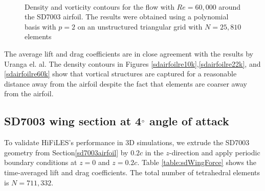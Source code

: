 \begin{figure}[htbp]
\centering
{}
\\

\caption{Density and vorticity contours for the flow with $Re = 60,000$ around the SD7003 airfoil. The results were obtained using a polynomial basis with $p=2$ on an unstructured triangular grid with $N = 25,810$ elements}
\label{sdairfoilre60k}
\end{figure}

The average lift and drag coefficients are in close agreement with the results by Uranga el. al\cite{uranga2011implicit}. The density contours in Figures \eqref{sdairfoilre10k},\eqref{sdairfoilre22k}, and \eqref{sdairfoilre60k} show that vortical structures are captured for a reasonable distance away from the airfoil despite the fact that elements are coarser away from the airfoil.


\newpage

\subsection{SD7003 wing section at 4$^{\circ}$ angle of attack}
To validate HiFiLES's performance in 3D simulations, we extrude the SD7003 geometry from Section\eqref{sd7003airfoil} by $0.2c$ in the $z$-direction and apply periodic boundary conditions at $z=0$ and $z=0.2c$. Table \eqref{table:sdWingForce} shows the time-averaged lift and drag coefficients. The total number of tetrahedral elements is $N = 711,332$.


